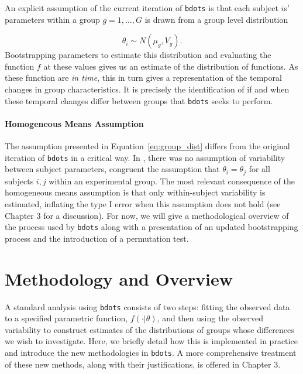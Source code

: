 \documentclass{article}
\newcommand{\xt}{\texttt}%
\begin{document}
An explicit assumption of the current iteration of \xt{bdots} is that each subject $i$s' parameters within a group $g = 1, \dots, G$ is drawn from a group level distribution

\begin{equation}\label{eq:group_dist}
\theta_i \sim N(\mu_g, V_g).
\end{equation}
Bootstrapping parameters to estimate this distribution and evaluating the function $f$ at these values gives us an estimate of the distribution of functions. As these function are \textit{in time}, this in turn gives a representation of the temporal changes in group characteristics. It is precisely the identification of if and when these temporal changes differ between groups that \xt{bdots} seeks to perform.


\paragraph{Homogeneous Means Assumption}

The assumption presented in Equation~\ref{eq:group_dist} differs from the original iteration of \xt{bdots} in a critical way. In \cite{oleson2017detecting}, there was no assumption of variability between subject parameters, congruent the assumption that $\theta_i = \theta_j$ for all subjects $i, j$ within an experimental group. The most relevant consequence of the homogeneous means assumption is that only within-subject variability is estimated, inflating the type I error when this assumption does not hold (see Chapter 3 for a discussion). For now, we will give a methodological overview of the process used by \xt{bdots} along with a presentation of an updated bootstrapping process and the introduction of a permutation test.




\section{Methodology and Overview} 

A standard analysis using \xt{bdots} consists of two steps: fitting the observed data to a specified parametric function, $f(\cdot|\theta)$, and then using the observed variability to construct estimates of the distributions of groups whose differences we wish to investigate.  Here, we briefly detail how this is implemented in practice and introduce the new methodologies in \xt{bdots}. A more comprehensive treatment of these new methods, along with their justifications, is offered in Chapter 3. 
\end{document}
